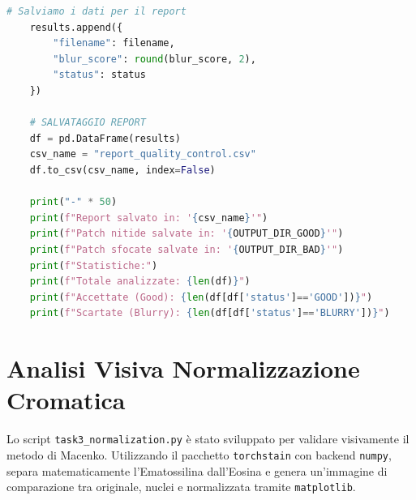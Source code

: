 \begin{lstlisting}[language=Python, caption={Script per il filtraggio delle patch sfocate tramite Varianza del Laplaciano.}]
	# Salviamo i dati per il report
	results.append({
		"filename": filename,
		"blur_score": round(blur_score, 2),
		"status": status
	})
	
	# SALVATAGGIO REPORT
	df = pd.DataFrame(results)
	csv_name = "report_quality_control.csv"
	df.to_csv(csv_name, index=False)
	
	print("-" * 50)
	print(f"Report salvato in: '{csv_name}'")
	print(f"Patch nitide salvate in: '{OUTPUT_DIR_GOOD}'")
	print(f"Patch sfocate salvate in: '{OUTPUT_DIR_BAD}'")
	print(f"Statistiche:")
	print(f"Totale analizzate: {len(df)}")
	print(f"Accettate (Good): {len(df[df['status']=='GOOD'])}")
	print(f"Scartate (Blurry): {len(df[df['status']=='BLURRY'])}")
\end{lstlisting}

\section{Analisi Visiva Normalizzazione Cromatica}
Lo script \texttt{task3\_normalization.py} è stato sviluppato per validare visivamente il metodo di Macenko. Utilizzando il pacchetto \texttt{torchstain} con backend \texttt{numpy}, separa matematicamente l'Ematossilina dall'Eosina e genera un'immagine di comparazione tra originale, nuclei e normalizzata tramite \texttt{matplotlib}.

